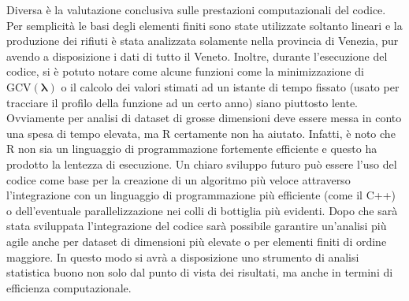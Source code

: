 \documentclass[a4paper,11pt,twoside,openright]{book}							%
\begin{document}
Diversa è la valutazione conclusiva sulle prestazioni computazionali del codice. Per semplicità le basi degli elementi finiti sono state utilizzate soltanto lineari e la produzione dei rifiuti è stata analizzata solamente nella provincia di Venezia, pur avendo a disposizione i dati di tutto il Veneto. Inoltre, durante l'esecuzione del codice, si è potuto notare come alcune funzioni come la minimizzazione di $\mathrm{GCV}(\bm \lambda)$ o il calcolo dei valori stimati ad un istante di tempo fissato (usato per tracciare il profilo della funzione ad un certo anno) siano piuttosto lente. Ovviamente per analisi di dataset di grosse dimensioni deve essere messa in conto una spesa di tempo elevata, ma R certamente non ha aiutato. Infatti, è noto che R non sia un linguaggio di programmazione fortemente efficiente e questo ha prodotto la lentezza di esecuzione. Un chiaro sviluppo futuro può essere l'uso del codice come base per la creazione di un algoritmo più veloce attraverso l'integrazione con un linguaggio di programmazione più efficiente (come il C++) o dell'eventuale parallelizzazione nei colli di bottiglia più evidenti. Dopo che sarà stata sviluppata l'integrazione del codice sarà possibile garantire un'analisi più agile anche per dataset di dimensioni più elevate o per elementi finiti di ordine maggiore. In questo modo si avrà a disposizione uno strumento di analisi statistica buono non solo dal punto di vista dei risultati, ma anche in termini di efficienza computazionale.
\end{document}
